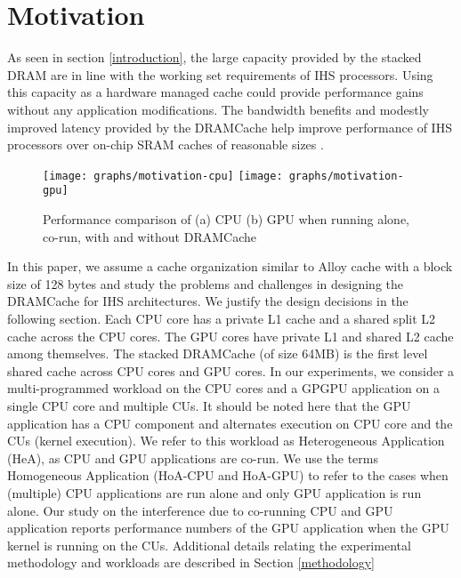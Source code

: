 \section{Motivation} \label{motivation}
As seen in section \ref{introduction}, the large capacity provided by the stacked DRAM are in line with the working set requirements of IHS processors. Using this capacity as a hardware managed cache could provide performance gains without any application modifications. The bandwidth benefits and modestly improved latency provided by the DRAMCache help improve performance of IHS processors over on-chip SRAM caches of reasonable sizes \cite{amd-exascale1}. 
\begin{figure}[htbp]
   \texttt{[image: graphs/motivation-cpu]}
   \texttt{[image: graphs/motivation-gpu]}
   \caption{Performance comparison of (a) CPU (b) GPU when running alone, co-run, with and without DRAMCache}
   \label{fig:motivation}
\end{figure}
\par In this paper, we assume a cache organization similar to Alloy cache \cite{alloy} with a block size of 128 bytes and study the problems and challenges in designing the DRAMCache for IHS architectures. We justify the design decisions in the following section. 
Each CPU core has a private L1 cache and a shared split L2 cache across the CPU cores. The GPU cores have private L1 and shared L2 cache among themselves.  
The stacked DRAMCache (of size 64MB) is the first level shared cache across CPU cores and GPU cores. In our experiments, we consider a multi-programmed workload on the CPU cores and a GPGPU application on a single CPU core and multiple CUs. It should be noted here that the GPU application has a CPU component and alternates execution on CPU core and the CUs (kernel execution). We refer to this workload as Heterogeneous Application (HeA), as CPU and GPU applications are co-run. We use the terms Homogeneous Application (HoA-CPU and HoA-GPU) to refer to the cases when (multiple) CPU applications are run alone and only GPU application is run alone.  Our study on the interference due to co-running CPU and GPU application reports performance numbers of the GPU application when the GPU kernel is running on the CUs.  
Additional details relating the experimental methodology and workloads are described in Section \ref{methodology}



